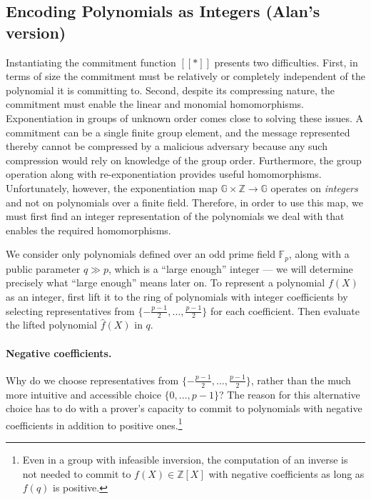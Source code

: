 \subsection{Encoding Polynomials as Integers (Alan's version)}
\label{sec:encoding}

Instantiating the commitment function $[\![*]\!]$ presents two difficulties. First, in terms of size the commitment must be relatively or completely independent of the polynomial it is committing to. Second, despite its compressing nature, the commitment must enable the linear and monomial homomorphisms. Exponentiation in groups of unknown order comes close to solving these issues. A commitment can be a single finite group element, and the message represented thereby cannot be compressed by a malicious adversary because any such compression would rely on knowledge of the group order. Furthermore, the group operation along with re-exponentiation provides useful homomorphisms. Unfortunately, however, the exponentiation map $\mathbb{G} \times \mathbb{Z} \rightarrow \mathbb{G}$ operates on \emph{integers} and not on polynomials over a finite field. Therefore, in order to use this map, we must first find an integer representation of the polynomials we deal with that enables the required homomorphisms.

We consider only polynomials defined over an odd prime field $\mathbb{F}_p$, along with a public parameter $q \gg p$, which is a ``large enough'' integer --- we will determine precisely what ``large enough'' means later on. To represent a polynomial $f(X)$ as an integer, first lift it to the ring of polynomials with integer coefficients by selecting representatives from $\{-\frac{p-1}{2}, \ldots, \frac{p-1}{2}\}$ for each coefficient. Then evaluate the lifted polynomial $\hat{f}(X)$ in $q$.

\paragraph{Negative coefficients.}
Why do we choose representatives from $\{-\frac{p-1}{2}, \ldots, \frac{p-1}{2}\}$, rather than the much more intuitive and accessible choice $\{0, \ldots, p-1\}$? The reason for this alternative choice has to do with a prover's capacity to commit to polynomials with negative coefficients in addition to positive ones.\footnote{Even in a group with infeasible inversion, the computation of an inverse is not needed to commit to $f(X) \in \mathbb{Z}[X]$ with negative coefficients as long as $f(q)$ is positive.}

